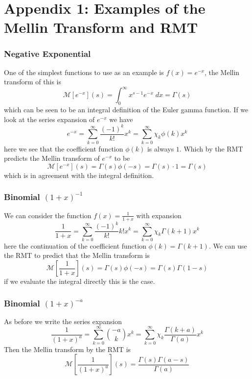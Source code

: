 \documentclass[journal=jcisd8,manuscript=article,layout=onecolumn,pdftex,floatfix,amsmath,amssymb,10pt]{achemso}
\begin{document}
\section{Appendix 1: Examples of the Mellin Transform and RMT}
\subsubsection{Negative Exponential}
One of the simplest functions to use as an example is $f(x)=e^{-x}$, the Mellin transform of this is
\begin{equation}
\mathcal{M}[e^{-x}](s) = \int_0^\infty x^{s-1}e^{-x} \; dx = \Gamma(s)
\end{equation}
which can be seen to be an integral definition of the Euler gamma function. If we look at the series expansion of $e^{-x}$ we have
\begin{equation}
e^{-x} = \sum_{k=0}^\infty \frac{(-1)^k}{k!} x^k = \sum_{k=0}^\infty \chi_k \phi(k) x^k
\end{equation}
here we see that the coefficient function $\phi(k)$ is always $1$. Which by the RMT predicts the Mellin transform of $e^{-x}$ to be
\begin{equation}
\mathcal{M}[e^{-x}](s) = \Gamma(s)\phi(-s) = \Gamma(s)\cdot 1 = \Gamma(s)
\end{equation}
which is in agreement with the integral definition.
\subsubsection{Binomial $(1+x)^{-1}$}
We can consider the function $f(x) = \frac{1}{1+x}$ with expansion
\begin{equation}
\frac{1}{1+x} = \sum_{k=0}^\infty \frac{(-1)^k}{k!} k! x^k = \sum_{k=0}^\infty \chi_k \Gamma(k+1) x^k
\end{equation}
here the continuation of the coefficient function $\phi(k) = \Gamma(k+1)$. We can use the RMT to predict that the Mellin transform is
\begin{equation}
\mathcal{M}\left[\frac{1}{1+x}\right](s) = \Gamma(s)\phi(-s) = \Gamma(s)\Gamma(1-s)
\end{equation}
if we evaluate the integral directly this is the case.
\subsubsection{Binomial $(1+x)^{-a}$}
As before we write the series expansion
\begin{equation}
\frac{1}{(1+x)^a} = \sum_{k=0}^\infty \binom{-a}{k} x^k = \sum_{k=0}^\infty \chi_k \frac{\Gamma(k+a)}{\Gamma(a)} x^k
\end{equation}
Then the Mellin transform by the RMT is 
\begin{equation}
\mathcal{M}\left[\frac{1}{(1+x)^a}\right](s) = \frac{\Gamma(s)\Gamma(a-s)}{\Gamma(a)}
\end{equation}
\end{document}
